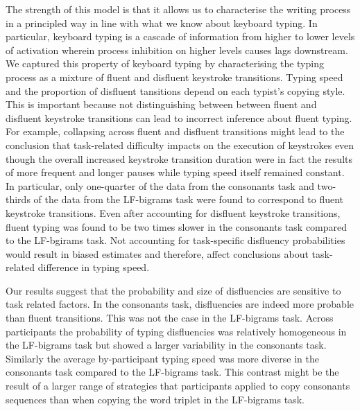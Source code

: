 \documentclass[
  english,
  man,mask,floatsintext]{apa7}
\begin{document}
The strength of this model is that it allows us to characterise the writing process in a principled way in line with what we know about keyboard typing. In particular, keyboard typing is a cascade of information from higher to lower levels of activation wherein process inhibition on higher levels causes lags downstream. We captured this property of keyboard typing by characterising the typing process as a mixture of fluent and disfluent keystroke transitions. Typing speed and the proportion of disfluent tansitions depend on each typist's copying style. This is important because not distinguishing between between fluent and disfluent keystroke transitions can lead to incorrect inference about fluent typing. For example, collapsing across fluent and disfluent transitions might lead to the conclusion that task-related difficulty impacts on the execution of keystrokes even though the overall increased keystroke transition duration were in fact the results of more frequent and longer pauses while typing speed itself remained constant. In particular, only one-quarter of the data from the consonants task and two-thirds of the data from the LF-bigrams task were found to correspond to fluent keystroke transitions. Even after accounting for disfluent keystroke transitions, fluent typing was found to be two times slower in the consonants task compared to the LF-bgirams task. Not accounting for task-specific disfluency probabilities would result in biased estimates and therefore, affect conclusions about task-related difference in typing speed.

Our results suggest that the probability and size of disfluencies are sensitive to task related factors. In the consonants task, disfluencies are indeed more probable than fluent transitions. This was not the case in the LF-bigrams task. Across participants the probability of typing disfluencies was relatively homogeneous in the LF-bigrams task but showed a larger variability in the consonants task. Similarly the average by-participant typing speed was more diverse in the consonants task compared to the LF-bigrams task. This contrast might be the result of a larger range of strategies that participants applied to copy consonants sequences than when copying the word triplet in the LF-bigrams task.
\end{document}
